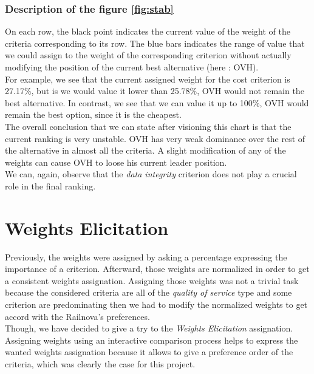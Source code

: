 \documentclass[a4paper,11pt]{article}
\begin{document}
\subsubsection*{Description of the figure \ref{fig:stab}}

On each row, the black point indicates the current value of the weight of the criteria corresponding to its row. The blue bars indicates the range of value that we could assign to the weight of the corresponding criterion without actually modifying the position of the current best alternative (here : OVH).\\

For example, we see that the current assigned weight for the cost criterion is 27.17\%, but is we would value it lower than 25.78\%, OVH would not remain the best alternative. In contrast, we see that we can value it up to 100\%, OVH would remain the best option, since it is the cheapest.\\

The overall conclusion that we can state after visioning this chart is that the current ranking is very unstable. OVH has very weak dominance over the rest of the alternative in almost all the criteria. A slight modification of any of the weights can cause OVH to loose his current leader position.\\

We can, again, observe that the \textit{data integrity} criterion does not play a crucial role in the final ranking.

\section{Weights Elicitation}
Previously, the weights were assigned by asking a percentage expressing the importance of a criterion. Afterward, those weights are normalized in order to get a consistent weights assignation. Assigning those weights was not a trivial task because the considered criteria are all of the \emph{quality of service} type and some criterion are predominating then we had to modify the normalized weights to get accord with the Railnova's preferences.\\

Though, we have decided to give a try to the \emph{Weights Elicitation} assignation. Assigning weights using an interactive comparison process helps to express the wanted weights assignation because it allows to give a preference order of the criteria, which was clearly the case for this project.\\
\end{document}
